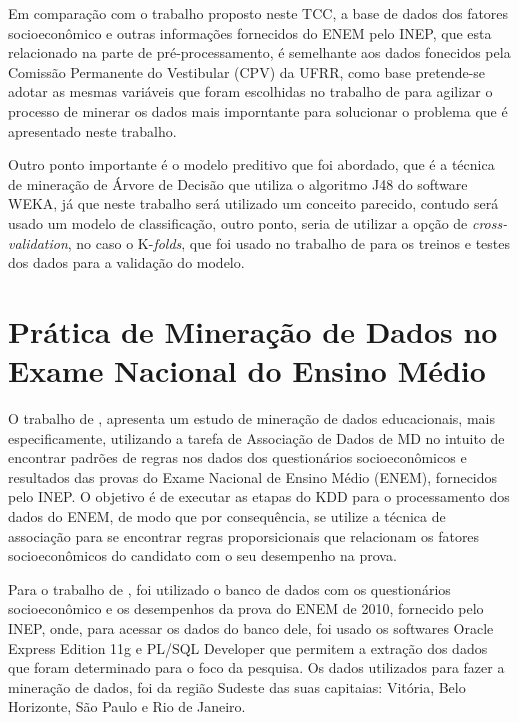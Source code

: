 \par
Em comparação com o trabalho proposto neste TCC,  a base de dados dos fatores socioeconômico e outras informações fornecidos do ENEM pelo INEP, que esta relacionado na parte de pré-processamento, é semelhante aos dados fonecidos pela Comissão Permanente do Vestibular (CPV) da UFRR, como base pretende-se adotar as mesmas variáveis que foram escolhidas no trabalho de  para agilizar o processo de minerar os dados mais imporntante para solucionar o problema que é apresentado neste trabalho.

\par
Outro ponto importante é o modelo preditivo que foi abordado, que é a técnica de mineração de Árvore de Decisão que utiliza o algoritmo J48 do software WEKA, já que neste trabalho será utilizado um conceito parecido, contudo será usado um modelo de classificação, outro ponto, seria de utilizar a opção de \textit{cross-validation}, no caso o K-\textit{folds}, que foi usado no trabalho de  para os treinos e testes dos dados para a validação do modelo.



\section{Prática de Mineração de Dados no Exame Nacional do Ensino Médio}

\par
O trabalho de , apresenta um estudo de mineração de dados educacionais, mais especificamente, utilizando a tarefa de Associação de Dados de MD no intuito de encontrar padrões de regras nos dados dos questionários socioeconômicos e resultados das provas do Exame Nacional de Ensino Médio (ENEM), fornecidos pelo INEP. O objetivo é de executar as etapas do KDD para o processamento dos dados do ENEM, de modo que por consequência, se utilize a técnica de associação para se encontrar regras proporsicionais que relacionam os fatores socioeconômicos do candidato com o seu desempenho na prova.

\par
Para o trabalho de , foi utilizado o banco de dados com os questionários socioeconômico e os desempenhos da prova do ENEM de 2010, fornecido pelo INEP, onde, para acessar os dados do banco dele, foi usado os softwares Oracle Express Edition 11g e PL/SQL Developer que permitem a extração dos dados que foram determinado para o foco da pesquisa. Os dados utilizados para fazer a mineração de dados, foi da região Sudeste das suas capitaias: Vitória, Belo Horizonte, São Paulo e Rio de Janeiro.

